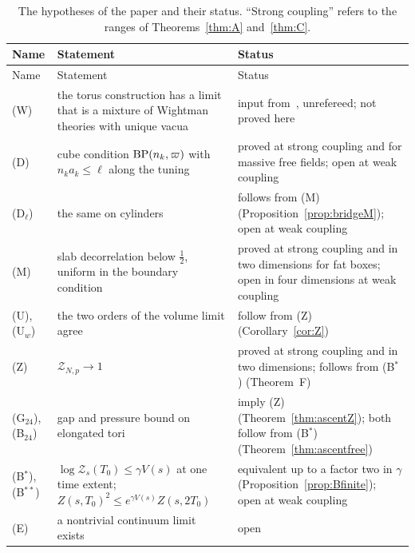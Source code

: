 {
\small
\setlength{\LTcapwidth}{\textwidth}
\begin{longtable}{@{}>{\raggedright\arraybackslash}p{}>{\raggedright\arraybackslash}p{}>{\raggedright\arraybackslash}p{}@{}}
\caption{The hypotheses of the paper and their status. ``Strong coupling''
refers to the ranges of Theorems~\ref{thm:A} and~\ref{thm:C}.}\label{tab:hyp}\\
\toprule
Name & Statement & Status\\
\midrule
\endfirsthead
\toprule
Name & Statement & Status\\
\midrule
\endhead
\bottomrule
\endfoot
\bottomrule
\endlastfoot
(W) & the torus construction has a limit that is a mixture of Wightman theories with unique vacua & input from~\cite{OAI26,YMG26}, unrefereed; not proved here\\
(D) & cube condition $\mathrm{BP}(n_k,\varpi)$ with $n_ka_k\le\ell$ along the tuning & proved at strong coupling and for massive free fields; open at weak coupling\\
(D$_\ell$) & the same on cylinders & follows from (M) (Proposition~\ref{prop:bridgeM}); open at weak coupling\\
(M) & slab decorrelation below $\frac12$, uniform in the boundary condition & proved at strong coupling and in two dimensions for fat boxes; open in four dimensions at weak coupling\\
(U), (U$_w$) & the two orders of the volume limit agree & follow from (Z) (Corollary~\ref{cor:Z})\\
(Z) & $\mathcal Z_{N,p}\to1$ & proved at strong coupling and in two dimensions; follows from (B$^{*}$) (Theorem~F)\\
(G$_{24}$), (B$_{24}$) & gap and pressure bound on elongated tori & imply (Z) (Theorem~\ref{thm:ascentZ}); both follow from (B$^{*}$) (Theorem~\ref{thm:ascentfree})\\
(B$^{*}$), (B$^{**}$) & $\log\mathcal Z_s(T_0)\le\gamma V(s)$ at one time extent; $Z(s,T_0)^2\le e^{\gamma V(s)}Z(s,2T_0)$ & equivalent up to a factor two in $\gamma$ (Proposition~\ref{prop:Bfinite}); open at weak coupling\\
(E) & a nontrivial continuum limit exists & open\\
\end{longtable}
}

